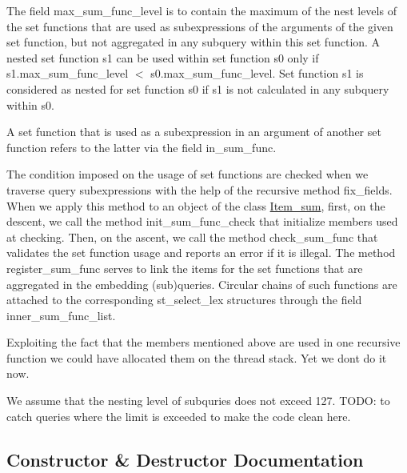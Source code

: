 The field \textquotesingle{}max\+\_\+sum\+\_\+func\+\_\+level\textquotesingle{} is to contain the maximum of the nest levels of the set functions that are used as subexpressions of the arguments of the given set function, but not aggregated in any subquery within this set function. A nested set function s1 can be used within set function s0 only if s1.\+max\+\_\+sum\+\_\+func\+\_\+level $<$ s0.\+max\+\_\+sum\+\_\+func\+\_\+level. Set function s1 is considered as nested for set function s0 if s1 is not calculated in any subquery within s0.

A set function that is used as a subexpression in an argument of another set function refers to the latter via the field \textquotesingle{}in\+\_\+sum\+\_\+func\textquotesingle{}.

The condition imposed on the usage of set functions are checked when we traverse query subexpressions with the help of the recursive method fix\+\_\+fields. When we apply this method to an object of the class \mbox{\hyperlink{classItem__sum}{Item\+\_\+sum}}, first, on the descent, we call the method init\+\_\+sum\+\_\+func\+\_\+check that initialize members used at checking. Then, on the ascent, we call the method check\+\_\+sum\+\_\+func that validates the set function usage and reports an error if it is illegal. The method register\+\_\+sum\+\_\+func serves to link the items for the set functions that are aggregated in the embedding (sub)queries. Circular chains of such functions are attached to the corresponding st\+\_\+select\+\_\+lex structures through the field inner\+\_\+sum\+\_\+func\+\_\+list.

Exploiting the fact that the members mentioned above are used in one recursive function we could have allocated them on the thread stack. Yet we don\textquotesingle{}t do it now.

We assume that the nesting level of subquries does not exceed 127. T\+O\+DO\+: to catch queries where the limit is exceeded to make the code clean here. ~\newline
 ~\newline
 

\subsection{Constructor \& Destructor Documentation}
\mbox{\label{classItem__sum_ab22d52290db63c5048f1aa712be2cad7}} 
